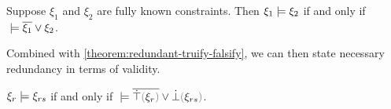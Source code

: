 \begin{lemma}
	\label{lemma:material-entailment}
	Suppose $\xi_1$ and $\xi_2$ are fully known constraints. Then $\xi_1 \models \xi_2$ if and only if $\; \models \overline{\xi_1} \vee \xi_2$.
\end{lemma}

Combined with \autoref{theorem:redundant-truify-falsify}, we can then state necessary redundancy in terms of validity.

\begin{theorem}
	\label{theorem:redundant-validity}
	$\xi_r \models \xi_{rs}$ if and only if $\ccsatisfy{\;}{\cor{\cdual{\ctruify{\xi_r}}}{\cfalsify{\xi_{rs}}}}$.
\end{theorem}









